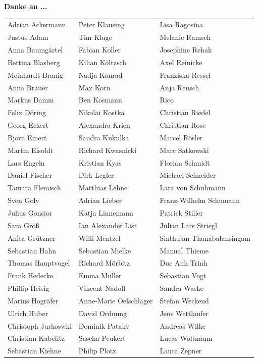 \textbf{Danke an ...}
\\

\begin{tabular}{l l l} 

Adrian Ackermann  & Peter Klausing  & Lisa Ragosina\\
Justus Adam  & Tim Kluge & Melanie Ramsch\\
Anna Baumgärtel  & Fabian Koller & Josephine Rehak\\
Bettina  Blasberg & Kilian Költzsch & Axel Reinicke\\
Meinhardt Branig & Nadja Konrad & Franziska Ressel\\
Anna Brauer & Max Korn & Anja Reusch\\
Markus Damm & Ben Kosmann  & Rico\\
Felix Döring  & Nikolai Kostka & Christian Riedel\\
Georg Eckert & Alexandra Krien & Christian Rose\\
Björn Einert & Sandra Kukulka & Marcel Rösler\\
Martin Eisoldt & Richard Kwasnicki & Marc Satkowski\\
Lars Engeln  & Kristian Kyas & Florian Schmidt\\
Daniel Fischer & Dirk Legler & Michael Schneider\\
Tamara Flemisch & Matthias Lehne & Lara von Schuhmann\\
Sven Goly & Adrian Lieber & Franz-Wilhelm Schumann\\
Julius Gonsior & Katja Linnemann & Patrick Stiller\\
Sara Groß & Ian Alexander List & Julian Lars Striegl\\
Anita Grützner & Willi Mentzel & Sinthujan Thanabalansingam\\
Sebastian Hahn & Sebastian Mielke & Manual Thieme\\
Thomas Hauptvogel & Richard Mörbitz & Duc Anh Trinh\\
Frank Hedecke & Emma Müller & Sebastian Vogt\\
Phillip Heisig & Vincent Nadoll & Sandra Waske\\
Marius Hogräfer & Anne-Marie Oelschläger & Stefan Weckend\\
Ulrich Huber & David Ordnung & Jens Wettlaufer\\
Christoph Jurkoswki & Dominik Pataky & Andreas Wilke\\
Christian Kabelitz & Sascha Peukert & Lucas Woltmann\\
Sebastian Kiehne & Philip Plotz & Laura Zepner\\

\end{tabular}

